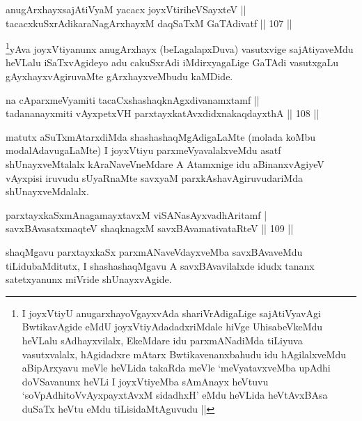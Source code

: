 \begin{shl}
anugArxhayxsajAtiVyaM yacacx joyxVtiriheVSayxteV ||  \\
tacacxkuSxrAdikaraNagArxhayxM daqSaTxM GaTAdivatf \hfill||  107 ||  
\end{shl}

\begin{artha}
\footnote{I joyxVtiyU anugarxhayoVgayxvAda shariVrAdigaLige sajAtiVyavAgi BwtikavAgide eMdU joyxVtiyAdadadxriMdale hiVge UhisabeVkeMdu heVLalu sAdhayxvilalx, EkeMdare idu parxmANadiMda tiLiyuva vasutxvalalx, hAgidadxre mAtarx Bwtikavenanxbahudu idu hAgilalxveMdu aBipArxyavu meVle heVLida takaRda meVle `meVyatavxveMba upAdhi doVSavanunx heVLi I joyxVtiyeMba sAmAnayx heVtuvu `soVpAdhitoVvAyxpayxtAvxM sidadhxH' eMdu heVLida heVtAvxBAsa duSaTx heVtu eMdu tiLisidaMtAguvudu ||}yAva joyxVtiyanunx anugArxhayx (beLagalapxDuva) vasutxvige sajAtiyaveMdu heVLalu iSaTxvAgideyo adu cakuSxrAdi iMdirxyagaLige GaTAdi vasutxgaLu gAyxhayxvAgiruvaMte gArxhayxveMbudu kaMDide.
\end{artha}

\begin{shl}
na cAparxmeVyamiti tacaCxshashaqknAgxdivanamxtamf ||  \\
tadananayxmiti vAyxpetxVH parxtayxkatAvxdidxnakaqdayxthA \hfill||  108 ||  
\end{shl}

\begin{artha}
matutx aSuTxmAtarxdiMda shashashaqMgAdigaLaMte (molada koMbu modalAdavugaLaMte) I joyxVtiyu parxmeVyavalalxveMdu asatf shUnayxveMtalalx kAraNaveVneMdare A Atamxnige idu aBinanxvAgiyeV vAyxpisi iruvudu sUyaRnaMte savxyaM parxkAshavAgiruvudariMda shUnayxveMdalalx.
\end{artha}


\begin{shl}
parxtayxkaSxmAnagamayxtavxM viSANasAyxvadhAritamf | \\
savxBAvasatxmaqteV shaqknagxM savxBAvamativataRteV \hfill||  109 ||  
\end{shl}

\begin{artha}
shaqMgavu parxtayxkaSx parxmANaveVdayxveMba savxBAvaveMdu tiLidubaMditutx, I shashashaqMgavu A savxBAvavilalxde idudx tananx satetxyanunx miVride shUnayxvAgide.
\end{artha}

